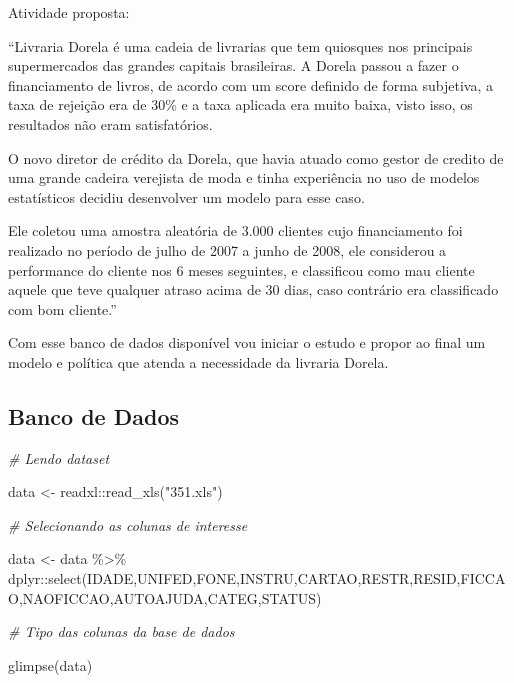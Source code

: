 \documentclass[
]{book}
\newenvironment{Shaded}{\begin{snugshade}}{\end{snugshade}}
\newcommand{\CommentTok}[1]{\textcolor[rgb]{0.56,0.35,0.01}{\textit{#1}}}
\newcommand{\FunctionTok}[1]{\textcolor[rgb]{0.00,0.00,0.00}{#1}}
\newcommand{\NormalTok}[1]{#1}
\newcommand{\OtherTok}[1]{\textcolor[rgb]{0.56,0.35,0.01}{#1}}
\newcommand{\SpecialCharTok}[1]{\textcolor[rgb]{0.00,0.00,0.00}{#1}}
\newcommand{\StringTok}[1]{\textcolor[rgb]{0.31,0.60,0.02}{#1}}
\begin{document}
Atividade proposta:

``Livraria Dorela é uma cadeia de livrarias que tem quiosques nos principais supermercados das grandes capitais brasileiras. A Dorela passou a fazer o financiamento de livros, de acordo com um score definido de forma subjetiva, a taxa de rejeição era de 30\% e a taxa aplicada era muito baixa, visto isso, os resultados não eram satisfatórios.

O novo diretor de crédito da Dorela, que havia atuado como gestor de credito de uma grande cadeira verejista de moda e tinha experiência no uso de modelos estatísticos decidiu desenvolver um modelo para esse caso.

Ele coletou uma amostra aleatória de 3.000 clientes cujo financiamento foi realizado no período de julho de 2007 a junho de 2008, ele considerou a performance do cliente nos 6 meses seguintes, e classificou como mau cliente aquele que teve qualquer atraso acima de 30 dias, caso contrário era classificado com bom cliente.''

Com esse banco de dados disponível vou iniciar o estudo e propor ao final um modelo e política que atenda a necessidade da livraria Dorela.

\hypertarget{banco-de-dados}{%
\subsection{Banco de Dados}\label{banco-de-dados}}

\begin{Shaded}
\begin{Highlighting}[]
\CommentTok{\# Lendo dataset}

\NormalTok{data }\OtherTok{\textless{}{-}}\NormalTok{ readxl}\SpecialCharTok{::}\FunctionTok{read\_xls}\NormalTok{(}\StringTok{"351.xls"}\NormalTok{)}

\CommentTok{\# Selecionando as colunas de interesse}

\NormalTok{data }\OtherTok{\textless{}{-}}\NormalTok{ data }\SpecialCharTok{\%\textgreater{}\%}
\NormalTok{  dplyr}\SpecialCharTok{::}\FunctionTok{select}\NormalTok{(IDADE,UNIFED,FONE,INSTRU,CARTAO,RESTR,RESID,FICCAO,NAOFICCAO,AUTOAJUDA,CATEG,STATUS)}

\CommentTok{\# Tipo das colunas da base de dados}

\FunctionTok{glimpse}\NormalTok{(data)}
\end{Highlighting}
\end{Shaded}
\end{document}
